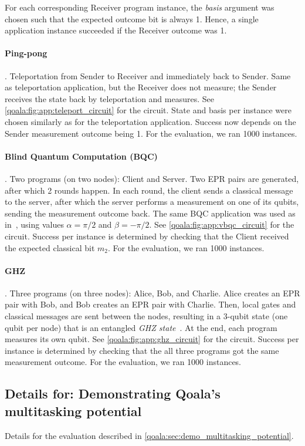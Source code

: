 For each corresponding Receiver program instance, the \textit{basis} argument was chosen such that the expected outcome bit is always 1.
Hence, a single application instance succeeded if the Receiver outcome was 1.

\paragraph{Ping-pong}. Teleportation from Sender to Receiver and immediately back to Sender.
Same as teleportation application, but the Receiver does not measure; the Sender receives the state back by teleportation and measures.
See \cref{qoala:fig:app:teleport_circuit} for the circuit.
State and basis per instance were chosen similarly as for the teleportation application.
Success now depends on the Sender measurement outcome being 1.
For the evaluation, we ran 1000 instances.

\paragraph{Blind Quantum Computation (BQC)}.
Two programs (on two nodes): Client and Server.
Two EPR pairs are generated, after which 2 rounds happen. In each round, the client sends a classical message to the server, after which the server performs a measurement on one of its qubits, sending the measurement outcome back.
The same BQC application was used as in~\cite{dahlberg2022netqasm}, using values $\alpha = \pi/2$ and $\beta = -\pi/2$.
See \cref{qoala:fig:app:vbqc_circuit} for the circuit.
Success per instance is determined by checking that the Client received the expected classical bit $m_2$.
For the evaluation, we ran 1000 instances.

\paragraph{GHZ}. 
Three programs (on three nodes): Alice, Bob, and Charlie.
Alice creates an EPR pair with Bob, and Bob creates an EPR pair with Charlie.
Then, local gates and classical messages are sent between the nodes, resulting in a 3-qubit state (one qubit per node) that is an entangled \textit{GHZ state}~\cite{greenberger1989going}.
At the end, each program measures its own qubit.
See \cref{qoala:fig:app:ghz_circuit} for the circuit.
Success per instance is determined by checking that the all three programs got the same measurement outcome.
For the evaluation, we ran 1000 instances.

\subsection{Details for: Demonstrating Qoala's multitasking potential}
Details for the evaluation described in \cref{qoala:sec:demo_multitasking_potential}.

